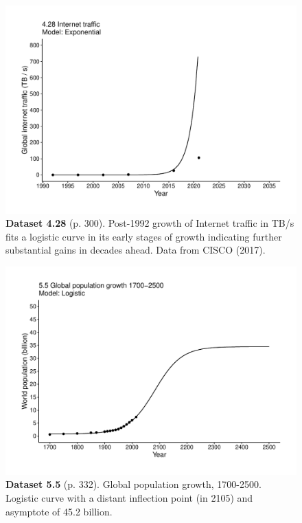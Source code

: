 \documentclass[aps,rmp,preprint,superscriptaddress,10pt,onecolumn]{article}
\begin{document}
\clearpage
\begin{figure}[h]
\includegraphics[width=\textwidth]{output/figs-ggplot/4.28.pdf}
\caption*{\textbf{Dataset 4.28} (p. 300). Post-1992 growth of Internet traffic in TB/s fits a logistic curve in its early stages of growth indicating further substantial gains in decades ahead. Data from CISCO (2017).}
\end{figure}
	
\clearpage
\begin{figure}[h]
\includegraphics[width=\textwidth]{output/figs-ggplot/5.5.pdf}
\caption*{\textbf{Dataset 5.5} (p. 332). Global population growth, 1700-2500. Logistic curve with a distant inflection point (in 2105) and asymptote of 45.2 billion. }
\end{figure}
	
\end{document}
